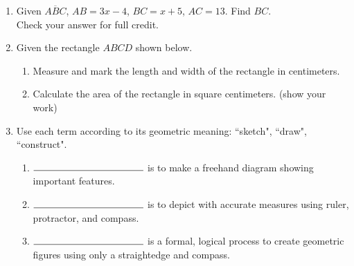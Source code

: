 \documentclass[12pt, twoside]{article}
\begin{document}
\begin{enumerate}
\newpage
\item Given $\overline{ABC}$, $AB=3x-4$, $BC=x+5$, $AC=13$. Find ${BC}$. \\ 
    Check your answer for full credit.
    \vspace{1cm}
      \begin{center}
      \end{center} \vspace{7cm}

\item Given the rectangle $ABCD$ shown below.
  \begin{enumerate}
    \item Measure and mark the length and width of the rectangle in centimeters.
    \item Calculate the area of the rectangle in square centimeters. (show your work)
  \end{enumerate}
  \vspace{1cm}
  \begin{center}
  \end{center}

\newpage
\item Use each term according to its geometric meaning: ``sketch", ``draw", ``construct".
  \begin{enumerate}
    \item $\rule{4cm}{0.15mm}$ is to make a freehand diagram showing important features. \smallskip
    \item $\rule{4cm}{0.15mm}$ is to depict with accurate measures using ruler, protractor, and compass. \smallskip
    \item $\rule{4cm}{0.15mm}$ is a formal, logical process to create geometric figures using only a straightedge and compass.
  \end{enumerate} \smallskip


\end{enumerate}
\end{document}
